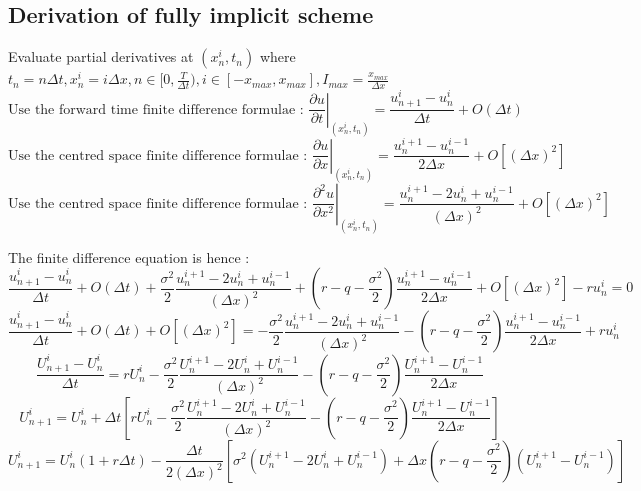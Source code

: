 \subsection{Derivation of fully implicit scheme}
Evaluate partial derivatives at $(x_{n}^{i}, t_{n})$ where $t_{n} = n\Delta t, x_{n}^{i} = i\Delta x, n \in [0, \frac{T}{\Delta t}), i \in [-x_{max}, x_{max}], I_{max} = \frac{x_{max}}{\Delta x}$
$$ \text{Use the forward time finite difference formulae : } \left. \frac{\partial u}{\partial t} \right| _{(x_{n}^{i}, t_{n})} = \frac{u_{n+1}^{i} - u_{n}^{i}}{\Delta t} + O(\Delta t)$$
$$ \text{Use the centred space finite difference formulae : } \left. \frac{\partial u}{\partial x} \right| _{(x_{n}^{i}, t_{n})} = \frac{u_{n}^{i+1} - u_{n}^{i-1}}{2\Delta x} + O[(\Delta x)^{2}]$$
$$ \text{Use the centred space finite difference formulae : } \left. \frac{\partial^{2} u}{\partial x^{2}} \right| _{(x_{n}^{i}, t_{n})} = \frac{u_{n}^{i+1} - 2u_{n}^{i} + u_{n}^{i-1}}{(\Delta x)^{2}} + O[(\Delta x)^{2}]$$

The finite difference equation is hence : 
$$ \frac{u_{n+1}^{i} - u_{n}^{i}}{\Delta t} + O(\Delta t) + \frac{\sigma ^ {2}}{2}\frac{u_{n}^{i+1} -2u_{n}^{i} + u_{n}^{i-1}}{(\Delta x)^{2}} + (r - q - \frac{\sigma^{2}}{2})\frac{u_{n}^{i+1} - u_{n}^{i-1}}{2\Delta x} + O[(\Delta x)^{2}] -ru_{n}^{i} = 0$$
$$ \frac{u_{n+1}^{i} - u_{n}^{i}}{\Delta t} + O(\Delta t) + O[(\Delta x)^{2}] = -\frac{\sigma ^ {2}}{2}\frac{u_{n}^{i+1} -2u_{n}^{i} + u_{n}^{i-1}}{(\Delta x)^{2}} - (r - q - \frac{\sigma^{2}}{2})\frac{u_{n}^{i+1} - u_{n}^{i-1}}{2\Delta x} + ru_{n}^{i}$$
$$ \frac{U_{n+1}^{i} - U_{n}^{i}}{\Delta t} = rU_{n}^{i} - \frac{\sigma ^ {2}}{2}\frac{U_{n}^{i+1} -2U_{n}^{i} + U_{n}^{i-1}}{(\Delta x)^{2}} - (r - q - \frac{\sigma^{2}}{2})\frac{U_{n}^{i+1} - U_{n}^{i-1}}{2\Delta x}$$
$$ U_{n+1}^{i} = U_{n}^{i} + \Delta t[rU_{n}^{i} - \frac{\sigma ^ {2}}{2}\frac{U_{n}^{i+1} -2U_{n}^{i} + U_{n}^{i-1}}{(\Delta x)^{2}} - (r - q - \frac{\sigma^{2}}{2})\frac{U_{n}^{i+1} - U_{n}^{i-1}}{2\Delta x}]$$
$$ U_{n+1}^{i} = U_{n}^{i} (1+ r \Delta t) - \frac{\Delta t}{2(\Delta x)^{2}}[\sigma ^ {2}(U_{n}^{i+1} -2U_{n}^{i} + U_{n}^{i-1}) + \Delta x(r - q - \frac{\sigma^{2}}{2})(U_{n}^{i+1} - U_{n}^{i-1})]$$



